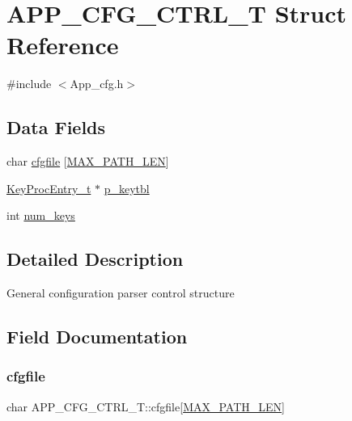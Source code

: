 \hypertarget{structAPP__CFG__CTRL__T}{}\section{A\+P\+P\+\_\+\+C\+F\+G\+\_\+\+C\+T\+R\+L\+\_\+T Struct Reference}
\label{structAPP__CFG__CTRL__T}


{\ttfamily \#include $<$App\+\_\+cfg.\+h$>$}

\subsection*{Data Fields}
\begin{DoxyCompactItemize}
\item 
char \mbox{\hyperlink{structAPP__CFG__CTRL__T_a9d5fb739b541d1e4b384c06cfdfb33f4}{cfgfile}} \mbox{[}\mbox{\hyperlink{gp__cfg_8h_abdd33f362ae3bbdacb5de76473aa8a2f}{M\+A\+X\+\_\+\+P\+A\+T\+H\+\_\+\+L\+EN}}\mbox{]}
\item 
\mbox{\hyperlink{structKEY__PROC__ENTRY}{Key\+Proc\+Entry\+\_\+t}} $\ast$ \mbox{\hyperlink{structAPP__CFG__CTRL__T_a8f122f4a05d1cd471bbf46faf80ad1ae}{p\+\_\+keytbl}}
\item 
int \mbox{\hyperlink{structAPP__CFG__CTRL__T_a139abd0e32665a65f7cad252671b7134}{num\+\_\+keys}}
\end{DoxyCompactItemize}


\subsection{Detailed Description}
General configuration parser control structure 

\subsection{Field Documentation}
\mbox{\label{structAPP__CFG__CTRL__T_a9d5fb739b541d1e4b384c06cfdfb33f4}} 
\subsubsection{\texorpdfstring{cfgfile}{cfgfile}}
{\footnotesize\ttfamily char A\+P\+P\+\_\+\+C\+F\+G\+\_\+\+C\+T\+R\+L\+\_\+\+T\+::cfgfile\mbox{[}\mbox{\hyperlink{gp__cfg_8h_abdd33f362ae3bbdacb5de76473aa8a2f}{M\+A\+X\+\_\+\+P\+A\+T\+H\+\_\+\+L\+EN}}\mbox{]}}

